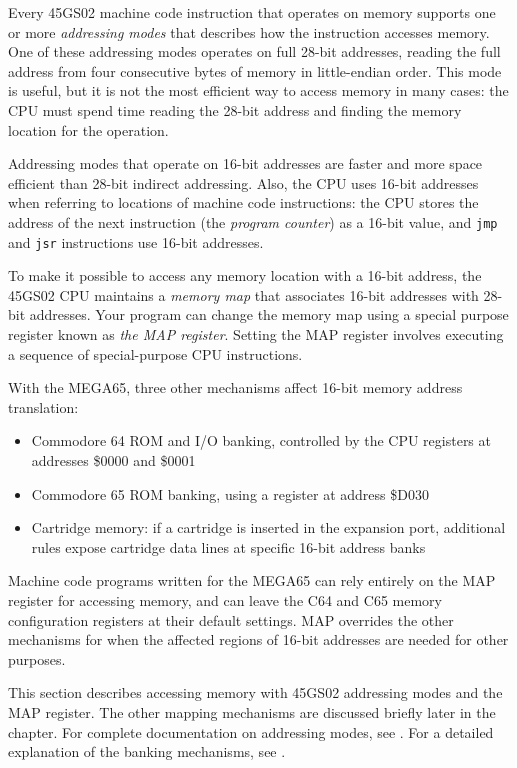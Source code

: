 Every 45GS02 machine code instruction that operates on memory supports one or more {\em addressing modes} that describes how the instruction accesses memory. One of these addressing modes operates on full 28-bit addresses, reading the full address from four consecutive bytes of memory in little-endian order. This mode is useful, but it is not the most efficient way to access memory in many cases: the CPU must spend time reading the 28-bit address and finding the memory location for the operation.

Addressing modes that operate on 16-bit addresses are faster and more space efficient than 28-bit indirect addressing. Also, the CPU uses 16-bit addresses when referring to locations of machine code instructions: the CPU stores the address of the next instruction (the {\em program counter}) as a 16-bit value, and \texttt{jmp} and \texttt{jsr} instructions use 16-bit addresses.

To make it possible to access any memory location with a 16-bit address, the 45GS02 CPU maintains a {\em memory map} that associates 16-bit addresses with 28-bit addresses. Your program can change the memory map using a special purpose register known as {\em the MAP register}. Setting the MAP register involves executing a sequence of special-purpose CPU instructions.

With the MEGA65, three other mechanisms affect 16-bit memory address translation:

\begin{itemize}
\item Commodore 64 ROM and I/O banking, controlled by the CPU registers at addresses \$0000 and \$0001
\item Commodore 65 ROM banking, using a register at address \$D030
\item Cartridge memory: if a cartridge is inserted in the expansion port, additional rules expose cartridge data lines at specific 16-bit address banks
\end{itemize}

Machine code programs written for the MEGA65 can rely entirely on the MAP register for accessing memory, and can leave the C64 and C65 memory configuration registers at their default settings. MAP overrides the other mechanisms for when the affected regions of 16-bit addresses are needed for other purposes.

This section describes accessing memory with 45GS02 addressing modes and the MAP register. The other mapping mechanisms are discussed briefly later in the chapter. For complete documentation on addressing modes, see . For a detailed explanation of the banking mechanisms, see .

